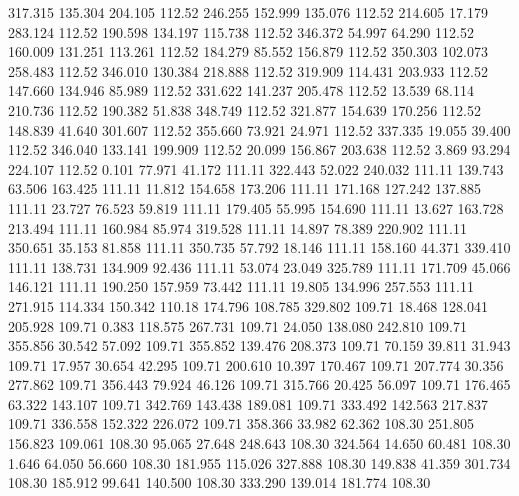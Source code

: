  317.315  135.304  204.105       112.52
 246.255  152.999  135.076       112.52
 214.605   17.179  283.124       112.52
 190.598  134.197  115.738       112.52
 346.372   54.997   64.290       112.52
 160.009  131.251  113.261       112.52
 184.279   85.552  156.879       112.52
 350.303  102.073  258.483       112.52
 346.010  130.384  218.888       112.52
 319.909  114.431  203.933       112.52
 147.660  134.946   85.989       112.52
 331.622  141.237  205.478       112.52
  13.539   68.114  210.736       112.52
 190.382   51.838  348.749       112.52
 321.877  154.639  170.256       112.52
 148.839   41.640  301.607       112.52
 355.660   73.921   24.971       112.52
 337.335   19.055   39.400       112.52
 346.040  133.141  199.909       112.52
  20.099  156.867  203.638       112.52
   3.869   93.294  224.107       112.52
   0.101   77.971   41.172       111.11
 322.443   52.022  240.032       111.11
 139.743   63.506  163.425       111.11
  11.812  154.658  173.206       111.11
 171.168  127.242  137.885       111.11
  23.727   76.523   59.819       111.11
 179.405   55.995  154.690       111.11
  13.627  163.728  213.494       111.11
 160.984   85.974  319.528       111.11
  14.897   78.389  220.902       111.11
 350.651   35.153   81.858       111.11
 350.735   57.792   18.146       111.11
 158.160   44.371  339.410       111.11
 138.731  134.909   92.436       111.11
  53.074   23.049  325.789       111.11
 171.709   45.066  146.121       111.11
 190.250  157.959   73.442       111.11
  19.805  134.996  257.553       111.11
 271.915  114.334  150.342       110.18
 174.796  108.785  329.802       109.71
  18.468  128.041  205.928       109.71
   0.383  118.575  267.731       109.71
  24.050  138.080  242.810       109.71
 355.856   30.542   57.092       109.71
 355.852  139.476  208.373       109.71
  70.159   39.811   31.943       109.71
  17.957   30.654   42.295       109.71
 200.610   10.397  170.467       109.71
 207.774   30.356  277.862       109.71
 356.443   79.924   46.126       109.71
 315.766   20.425   56.097       109.71
 176.465   63.322  143.107       109.71
 342.769  143.438  189.081       109.71
 333.492  142.563  217.837       109.71
 336.558  152.322  226.072       109.71
 358.366   33.982   62.362       108.30
 251.805  156.823  109.061       108.30
  95.065   27.648  248.643       108.30
 324.564   14.650   60.481       108.30
   1.646   64.050   56.660       108.30
 181.955  115.026  327.888       108.30
 149.838   41.359  301.734       108.30
 185.912   99.641  140.500       108.30
 333.290  139.014  181.774       108.30
